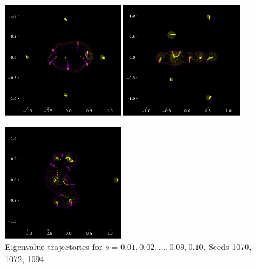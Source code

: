 \documentclass{article}
\begin{document}
	  \newpage

	  \begin{figure}[htbp]
		  \centering
		  \includegraphics[width=0.45\textwidth]{figures/initial_frame1070.pdf}
		  \includegraphics[width=0.45\textwidth]{figures/initial_frame1072.pdf}
  
		  \includegraphics[width=0.45\textwidth]{figures/initial_frame1094.pdf}
		  \caption{Eigenvalue trajectories for $s= 0.01, 0.02, \dots , 0.09, 0.10$. Seeds 1070, 1072, 1094}
		  \label{fig:pdf_image}
	   \end{figure}

	   \newpage
\end{document}
